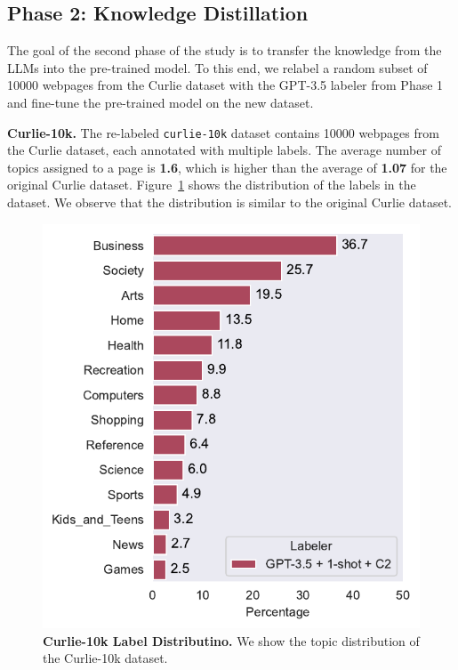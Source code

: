 \subsection{Phase 2: Knowledge Distillation}


The goal of the second phase of the study is to transfer the knowledge from the LLMs into the pre-trained model. To this end, we relabel a random subset of 10000 webpages from the Curlie dataset with the GPT-3.5 labeler from Phase 1 and fine-tune the pre-trained model on the new dataset. 

\textbf{Curlie-10k.} The re-labeled \texttt{curlie-10k} dataset contains 10000 webpages from the Curlie dataset, each annotated with multiple labels. The average number of topics assigned to a page is \textbf{1.6}, which is higher than the average of \textbf{1.07} for the original Curlie dataset. Figure~\ref{fig:curlie-10k-label-distribution} shows the distribution of the labels in the dataset. We observe that the distribution is similar to the original Curlie dataset.

\begin{figure}[!h]
    \centering
    \includegraphics[width=.8\columnwidth]{./figures/curlie-label-distribution.pdf}
    \caption{\textbf{Curlie-10k Label Distributino.} We show the topic distribution of the Curlie-10k dataset.}
    \label{fig:curlie-10k-label-distribution}
\end{figure}


